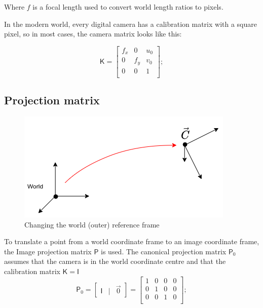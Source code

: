 Where $f$ is a focal length used to convert world length ratios to pixels.

In the modern world, every digital camera has a calibration matrix with a square pixel, so in most cases, the camera matrix looks like this:

\begin{equation}
    \label{eq:kmat}
    \pmb{\mathsf{K}} = \begin{bmatrix}
        f_x & 0 & u_0 \\
        0 & f_y & v_0 \\
        0 & 0 & 1 \\
    \end{bmatrix};
\end{equation}

\subsection{Projection matrix}

\begin{figure}[h]
    \centering
    \includegraphics[width=.5\textwidth]{graphics/frames.png}
    \caption{Changing the world (outer) reference frame}
    \label{fig:frames}
\end{figure}

To translate a point from a world coordinate frame to an image coordinate frame, the Image projection matrix $\pmb{\mathsf{P}}$ is used. 
The canonical projection matrix $\pmb{\mathsf{P}}_0$ assumes that the camera is in the world coordinate centre and that the calibration matrix $\pmb{\mathsf{K}} = \pmb{\mathsf{I}}$
\begin{equation}
\pmb{\mathsf{P}}_0 = \begin{bmatrix} \pmb{\mathsf{I}} & | & \vec{0} \end{bmatrix} = 
    \begin{bmatrix}
    1 & 0 & 0 & 0 \\
    0 & 1 & 0 & 0 \\
    0 & 0 & 1 & 0 \\
    \end{bmatrix};
\end{equation}


